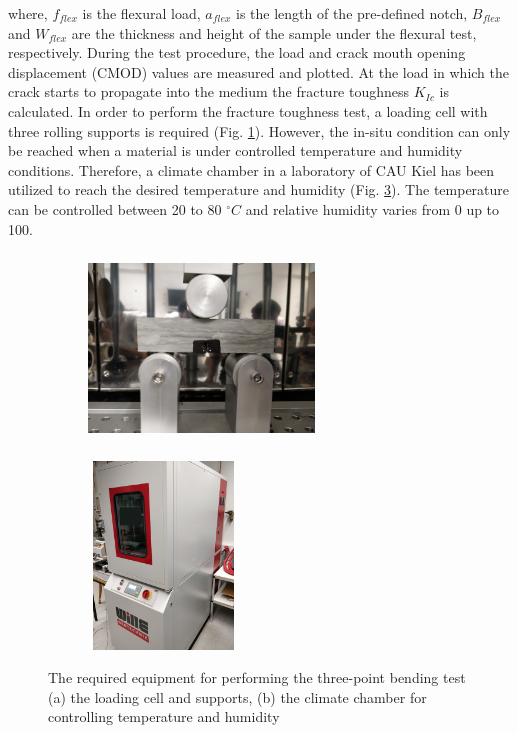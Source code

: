 where, $f_{flex}$ is the flexural load, $a_{flex}$ is the length of the pre-defined notch, $B_{flex}$ and $W_{flex}$ are the thickness and height of the sample under the flexural test, respectively. During the test procedure, the load and crack mouth opening displacement (CMOD) values are measured and plotted. At the load in which the crack starts to propagate into the medium the fracture toughness $K_{Ic}$ is calculated. In order to perform the fracture toughness test, a loading cell with three rolling supports is required (Fig. \ref{fig:Amir_Fracture_Toughness_Setup_a}). However, the in-situ condition can only be reached when a material is under controlled temperature and humidity conditions. Therefore, a climate chamber in a laboratory of CAU Kiel has been utilized to reach the desired temperature and humidity (Fig. \ref{fig:Amir_Fracture_Toughness_Setup_b}). The temperature can be controlled between 20 to 80 $^{\circ}C$ and relative humidity varies from 0 up to 100. 

\begin{figure}[!ht]
\centering
\begin{subfigure}[c]{0.6\textwidth}
\centering
\includegraphics[width=6cm,height=5cm]{figures/Amir_Fracture_Toughness_Setup_a.png}
\subcaption{}
\label{fig:Amir_Fracture_Toughness_Setup_a}
\end{subfigure}
\begin{subfigure}[c]{0.38\textwidth}
\centering
\includegraphics[width=4cm,height=5cm]{figures/Amir_Fracture_Toughness_Setup_b.png}
\subcaption{}
\label{fig:Amir_Fracture_Toughness_Setup_b}
\end{subfigure}
\caption{The required equipment for performing the three-point bending test (a) the loading cell and supports, (b) the climate chamber for controlling temperature and humidity}
\end{figure}

